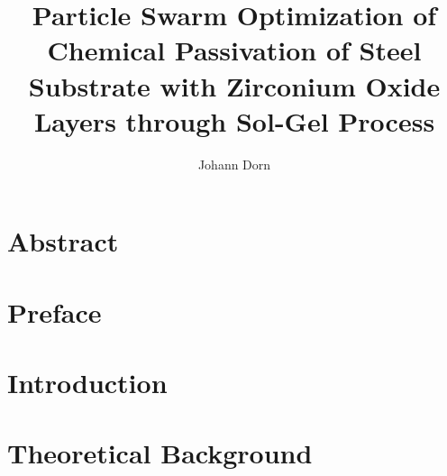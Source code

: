 \documentclass[a4paper,twoside,draft]{report}
\title{Particle Swarm Optimization of Chemical Passivation of Steel Substrate with Zirconium Oxide Layers through Sol-Gel Process}
\author{Johann Dorn}
\begin{document}



\chapter*{Abstract}


\chapter*{Preface}


\tableofcontents
\clearpage
\printglossaries
\clearpage

\chapter{Introduction}                                
\label{sec:intro}


%

\chapter{Theoretical Background}
\label{sec:theoretical}


%

\end{document}
